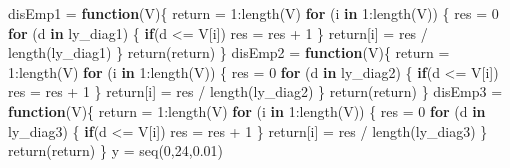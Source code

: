 \documentclass[
]{article}
\newenvironment{Shaded}{\begin{snugshade}}{\end{snugshade}}
\newcommand{\ControlFlowTok}[1]{\textcolor[rgb]{0.13,0.29,0.53}{\textbf{#1}}}
\newcommand{\DecValTok}[1]{\textcolor[rgb]{0.00,0.00,0.81}{#1}}
\newcommand{\FloatTok}[1]{\textcolor[rgb]{0.00,0.00,0.81}{#1}}
\newcommand{\FunctionTok}[1]{\textcolor[rgb]{0.00,0.00,0.00}{#1}}
\newcommand{\NormalTok}[1]{#1}
\newcommand{\OtherTok}[1]{\textcolor[rgb]{0.56,0.35,0.01}{#1}}
\newcommand{\SpecialCharTok}[1]{\textcolor[rgb]{0.00,0.00,0.00}{#1}}
\begin{document}
\begin{Shaded}
\begin{Highlighting}[]
\NormalTok{disEmp1 }\OtherTok{=} \ControlFlowTok{function}\NormalTok{(V)\{}
\NormalTok{  return }\OtherTok{=} \DecValTok{1}\SpecialCharTok{:}\FunctionTok{length}\NormalTok{(V)}
  \ControlFlowTok{for}\NormalTok{ (i }\ControlFlowTok{in} \DecValTok{1}\SpecialCharTok{:}\FunctionTok{length}\NormalTok{(V)) \{}
\NormalTok{    res }\OtherTok{=} \DecValTok{0}
    \ControlFlowTok{for}\NormalTok{ (d }\ControlFlowTok{in}\NormalTok{ ly\_diag1) \{}
      \ControlFlowTok{if}\NormalTok{(d }\SpecialCharTok{\textless{}=}\NormalTok{ V[i]) res }\OtherTok{=}\NormalTok{ res }\SpecialCharTok{+} \DecValTok{1}
\NormalTok{    \}}
\NormalTok{    return[i] }\OtherTok{=}\NormalTok{ res }\SpecialCharTok{/} \FunctionTok{length}\NormalTok{(ly\_diag1)}
\NormalTok{  \}}
  \FunctionTok{return}\NormalTok{(return)}
\NormalTok{\}}
\NormalTok{disEmp2 }\OtherTok{=} \ControlFlowTok{function}\NormalTok{(V)\{}
\NormalTok{  return }\OtherTok{=} \DecValTok{1}\SpecialCharTok{:}\FunctionTok{length}\NormalTok{(V)}
  \ControlFlowTok{for}\NormalTok{ (i }\ControlFlowTok{in} \DecValTok{1}\SpecialCharTok{:}\FunctionTok{length}\NormalTok{(V)) \{}
\NormalTok{    res }\OtherTok{=} \DecValTok{0}
    \ControlFlowTok{for}\NormalTok{ (d }\ControlFlowTok{in}\NormalTok{ ly\_diag2) \{}
      \ControlFlowTok{if}\NormalTok{(d }\SpecialCharTok{\textless{}=}\NormalTok{ V[i]) res }\OtherTok{=}\NormalTok{ res }\SpecialCharTok{+} \DecValTok{1}
\NormalTok{    \}}
\NormalTok{    return[i] }\OtherTok{=}\NormalTok{ res }\SpecialCharTok{/} \FunctionTok{length}\NormalTok{(ly\_diag2)}
\NormalTok{  \}}
  \FunctionTok{return}\NormalTok{(return)}
\NormalTok{\}}
\NormalTok{disEmp3 }\OtherTok{=} \ControlFlowTok{function}\NormalTok{(V)\{}
\NormalTok{  return }\OtherTok{=} \DecValTok{1}\SpecialCharTok{:}\FunctionTok{length}\NormalTok{(V)}
  \ControlFlowTok{for}\NormalTok{ (i }\ControlFlowTok{in} \DecValTok{1}\SpecialCharTok{:}\FunctionTok{length}\NormalTok{(V)) \{}
\NormalTok{    res }\OtherTok{=} \DecValTok{0}
    \ControlFlowTok{for}\NormalTok{ (d }\ControlFlowTok{in}\NormalTok{ ly\_diag3) \{}
      \ControlFlowTok{if}\NormalTok{(d }\SpecialCharTok{\textless{}=}\NormalTok{ V[i]) res }\OtherTok{=}\NormalTok{ res }\SpecialCharTok{+} \DecValTok{1}
\NormalTok{    \}}
\NormalTok{    return[i] }\OtherTok{=}\NormalTok{ res }\SpecialCharTok{/} \FunctionTok{length}\NormalTok{(ly\_diag3)}
\NormalTok{  \}}
  \FunctionTok{return}\NormalTok{(return)}
\NormalTok{\}}
\NormalTok{y }\OtherTok{=} \FunctionTok{seq}\NormalTok{(}\DecValTok{0}\NormalTok{,}\DecValTok{24}\NormalTok{,}\FloatTok{0.01}\NormalTok{)}


\end{Highlighting}
\end{Shaded}
\end{document}
